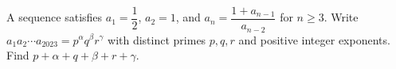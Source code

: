 A sequence satisfies $a_1=\dfrac{1}{2}$, $a_2=1$, and $a_n=\dfrac{1+a_{n-1}}{a_{n-2}}$ for $n\ge3$. Write $a_1a_2\cdots a_{2023}=p^\alpha q^\beta r^\gamma$ with distinct primes $p,q,r$ and positive integer exponents. Find $p+\alpha+q+\beta+r+\gamma$.
